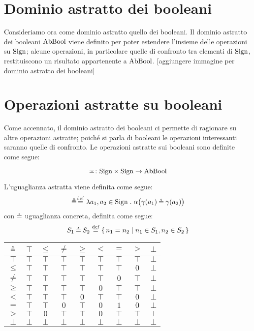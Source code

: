 \section{Dominio astratto dei booleani}

Consideriamo ora come dominio astratto quello dei booleani.
Il dominio astratto dei booleani $\mathrm{AbBool}$ viene definito per poter
estendere l'insieme delle operazioni su $\mathrm{Sign}$; alcune operazioni,
in particolare quelle di confronto tra elementi di $\mathrm{Sign}$,
restituiscono un risultato appartenente a $\mathrm{AbBool}$.
[aggiungere immagine per dominio astratto dei booleani]

\section{Operazioni astratte su booleani}

Come accennato, il dominio astratto dei booleani ci permette di
ragionare su altre operazioni astratte;
poiché si parla di booleani le operazioni interessanti
saranno quelle di confronto.
Le operazioni astratte sui booleani sono definite come segue:
\begin{definizione}
\[
	\mathord{\eqcirc}\colon\mathrm{Sign} \times \mathrm{Sign}\to\mathrm{AbBool}
\]
\end{definizione}

\begin{definizione}
L'uguaglianza astratta viene definita come segue:
\[
	\abseq \defeq \lambda a_1,a_2 \in \Sign \st \alpha\bigl(\gamma(a_1) \coneq \gamma(a_2)\bigr)
\]
con $\mathbin{\circeq}$ uguaglianza concreta, definita come segue:
\[
	S_1 \coneq S_2 \defeq \{\, n_1 = n_2 \mid n_1 \in S_1, n_2 \in S_2 \,\}
\]
\end{definizione}
\begin{center}
	\begin{tabular}{ c | c c c c c c c c }
		$\mathrel{\triangleq}$ & $\top$ & $\leq$ & $\neq$ & $\geq$ & $<$ & $=$ & $>$ & $\bot$ \\
		\hline
		$\top$ & $\top$ & $\top$ & $\top$ & $\top$ & $\top$ & $\top$ & $\top$ & $\bot$ \\
		$\leq$ & $\top$ & $\top$ & $\top$ & $\top$ & $\top$ & $\top$ & $0$ & $\bot$\\
		$\neq$ & $\top$ & $\top$ & $\top$ & $\top$ & $\top$ & $0$ & $\top$ & $\bot$\\
		$\geq$ & $\top$ & $\top$ & $\top$ & $\top$ & $0$ & $\top$ & $\top$ & $\bot$\\
		$<$ & $\top$ & $\top$ & $\top$ & $0$ & $\top$ & $\top$ & $0$ & $\bot$\\
		$=$ & $\top$ & $\top$ & $0$ & $\top$ & $0$ & $1$ & $0$ & $\bot$\\
		$>$ & $\top$ & $0$ & $\top$ & $\top$ & $0$ & $\top$ & $\top$ & $\bot$\\
		$\bot$ & $\bot$ & $\bot$ & $\bot$ & $\bot$ & $\bot$ & $\bot$ & $\bot$ & $\bot$
	\end{tabular}
\end{center}


